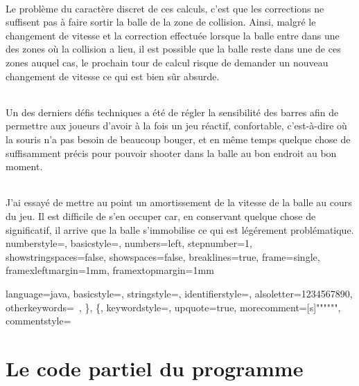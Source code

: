 \documentclass[a4paper,12pt]{report}
\begin{document}
\paragraph{}
Le problème du caractère discret de ces calculs, c'est que les corrections ne suffisent pas à faire sortir la balle de la zone de collision. Ainsi, malgré le changement de vitesse et la correction effectuée lorsque la balle entre dans une des zones où la collision a lieu, il est possible que la balle reste dans une de ces zones auquel cas, le prochain tour de calcul risque de demander un nouveau changement de vitesse ce qui est bien sûr absurde.
\paragraph{}
Un des derniers défis techniques a été de régler la sensibilité des barres afin de permettre aux joueurs d'avoir à la fois un jeu réactif, confortable, c'est-à-dire où la souris n'a pas besoin de beaucoup bouger, et en même temps quelque chose de suffisamment précis pour pouvoir shooter dans la balle au bon endroit au bon moment.
\paragraph{}
J'ai essayé de mettre au point un amortissement de la vitesse de la balle au cours du jeu. Il est difficile de s'en occuper car, en conservant quelque chose de significatif, il arrive que la balle s'immobilise ce qui est légérement problématique.
\lstset
{
	numberstyle=\footnotesize,
	basicstyle=\ttfamily\footnotesize,
	numbers=left,
	stepnumber=1,
	showstringspaces=false,
	showspaces=false,
	breaklines=true,
	frame=single,
	framexleftmargin=1mm,
	framextopmargin=1mm
}


\lstset{language=Java}
\lstset
{
	language=java,
	basicstyle=\ttfamily\footnotesize,
	stringstyle=\color{red},
	identifierstyle=\color{black}, %
	alsoletter={1234567890},
	otherkeywords={\ , \}, \{},
	keywordstyle=\color{blue},
	upquote=true,
	morecomment=[s]{"""}{"""},
	commentstyle=\color{gray}\slshape
}

\part{Le code partiel du programme}
	\setcounter{chapter}{0}
	
	
\end{document}
